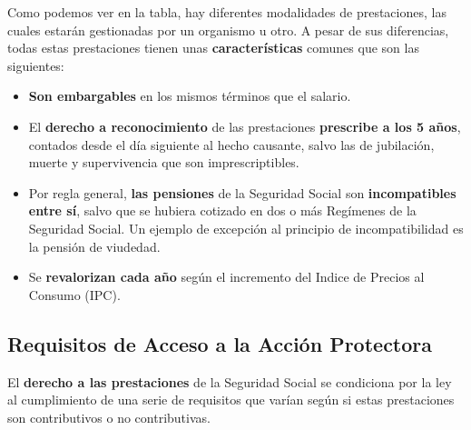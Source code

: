 Como podemos ver en la tabla, hay diferentes modalidades de prestaciones, las cuales estarán gestionadas por un organismo u otro. A pesar de sus diferencias, todas estas prestaciones tienen unas \textbf{características} comunes que son las siguientes:
\begin{itemize}
    \item \textbf{Son embargables} en los mismos términos que el salario.
    \item El \textbf{derecho a reconocimiento} de las prestaciones \textbf{prescribe a los 5 años}, contados desde el día siguiente al hecho causante, salvo las de jubilación, muerte y supervivencia que son imprescriptibles.
    \item Por regla general, \textbf{las pensiones} de la Seguridad Social son \textbf{incompatibles entre sí}, salvo que se hubiera cotizado en dos o más Regímenes de la Seguridad Social. Un ejemplo de excepción al principio de incompatibilidad es la pensión de viudedad.
    \item Se \textbf{revalorizan cada año} según el incremento del Indice de Precios al Consumo (IPC).
\end{itemize}

\subsection{Requisitos de Acceso a la Acción Protectora}
El \textbf{derecho a las prestaciones} de la Seguridad Social se condiciona por la ley al cumplimiento de una serie de requisitos que varían según si estas prestaciones son contributivos o no contributivas.

